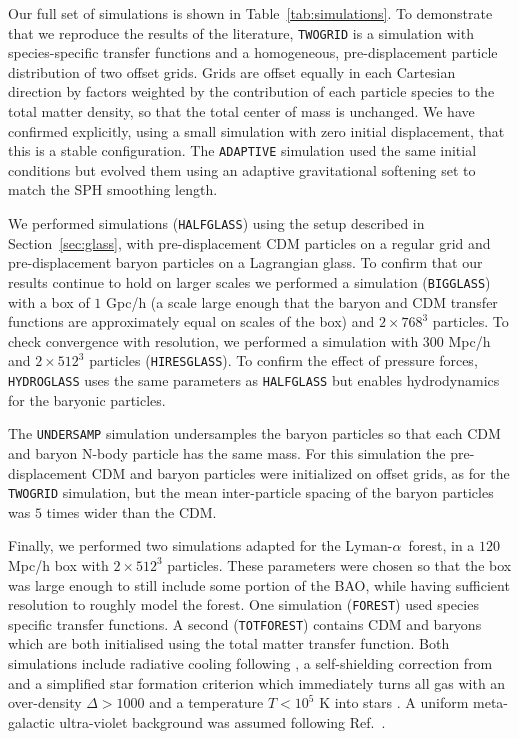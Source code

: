 \documentclass[a4paper,11pt]{article}
\newcommand{\Lya}{Lyman-$\alpha$}
\begin{document}
Our full set of simulations is shown in Table~\ref{tab:simulations}. To demonstrate that we reproduce the results of the literature, \texttt{TWOGRID} is a simulation with species-specific transfer functions and a homogeneous, pre-displacement particle distribution of two offset grids. Grids are offset equally in each Cartesian direction by factors weighted by the contribution of each particle species to the total matter density, so that the total center of mass is unchanged. We have confirmed explicitly, using a small simulation with zero initial displacement, that this is a stable configuration. The \texttt{ADAPTIVE} simulation used the same initial conditions but evolved them using an adaptive gravitational softening set to match the SPH smoothing length.

We performed simulations (\texttt{HALFGLASS}) using the setup described in Section~\ref{sec:glass}, with pre-displacement CDM particles on a regular grid and pre-displacement baryon particles on a Lagrangian glass. To confirm that our results continue to hold on larger scales we performed a simulation (\texttt{BIGGLASS}) with a box of $1$ Gpc/h (a scale large enough that the baryon and CDM transfer functions are approximately equal on scales of the box) and $2\times 768^3$ particles. To check convergence with resolution, we performed a simulation with $300$ Mpc/h and $2\times 512^3$ particles (\texttt{HIRESGLASS}). To confirm the effect of pressure forces, \texttt{HYDROGLASS} uses the same parameters as \texttt{HALFGLASS} but enables hydrodynamics for the baryonic particles.

The \texttt{UNDERSAMP} simulation undersamples the baryon particles so that each CDM and baryon N-body particle has the same mass. For this simulation the pre-displacement CDM and baryon particles were initialized on offset grids, as for the \texttt{TWOGRID} simulation, but the mean inter-particle spacing of the baryon particles was $5$ times wider than the CDM.

Finally, we performed two simulations adapted for the \Lya~forest, in a $120$ Mpc/h box with $2\times 512^3$ particles. These parameters were chosen so that the box was large enough to still include some portion of the BAO, while having sufficient resolution to roughly model the forest. One simulation (\texttt{FOREST}) used species specific transfer functions. A second (\texttt{TOTFOREST}) contains CDM and baryons which are both initialised using the total matter transfer function. Both simulations include radiative cooling following \cite{Katz:1996}, a self-shielding correction from \cite{Rahmati:2013} and a simplified star formation criterion which immediately turns all gas with an over-density $\Delta > 1000$ and a temperature $T < 10^5$ K into stars \cite{Viel:2004}. A uniform meta-galactic ultra-violet background was assumed following Ref.~\cite{Puchwein:2018}.
\end{document}
